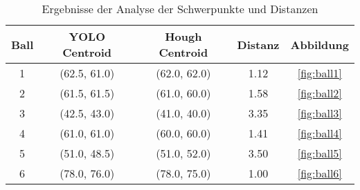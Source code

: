 \begin{table}[H]
    \centering
    \begin{tabular}{|c|c|c|c|c|}
    \hline
    \textbf{Ball} & \textbf{YOLO Centroid} & \textbf{Hough Centroid} & \textbf{Distanz} & \textbf{Abbildung} \\ \hline
    1 & (62.5, 61.0) & (62.0, 62.0) & 1.12 & \ref{fig:ball1} \\ \hline
    2 & (61.5, 61.5) & (61.0, 60.0) & 1.58 & \ref{fig:ball2} \\ \hline
    3 & (42.5, 43.0) & (41.0, 40.0) & 3.35 & \ref{fig:ball3} \\ \hline
    4 & (61.0, 61.0) & (60.0, 60.0) & 1.41 & \ref{fig:ball4} \\ \hline
    5 & (51.0, 48.5) & (51.0, 52.0) & 3.50 & \ref{fig:ball5} \\ \hline
    6 & (78.0, 76.0) & (78.0, 75.0) & 1.00 & \ref{fig:ball6} \\ \hline
    \end{tabular}
    \caption{Ergebnisse der Analyse der Schwerpunkte und Distanzen}
    \label{tab:centroid_distances}
\end{table}

\begin{minipage}[t]{0.3\textwidth}
\end{minipage}
%
\begin{minipage}[t]{0.3\textwidth}
\end{minipage}
%
\begin{minipage}[t]{0.3\textwidth}
\end{minipage}


\begin{minipage}[t]{0.3\textwidth}
\end{minipage}
%
\begin{minipage}[t]{0.3\textwidth}
\end{minipage}
%
\begin{minipage}[t]{0.3\textwidth}
\end{minipage}

